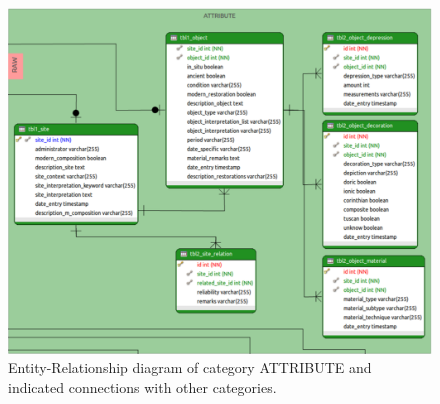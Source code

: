 \begin{figure}[H]
\centering
\includegraphics[scale=0.35]{fig/database/ERDB_ATTRIBUTE_conn.pdf}
\caption{Entity-Relationship diagram of category  ATTRIBUTE and indicated connections with other categories.}
\label{fig:db_erdb_attribute}
\end{figure}